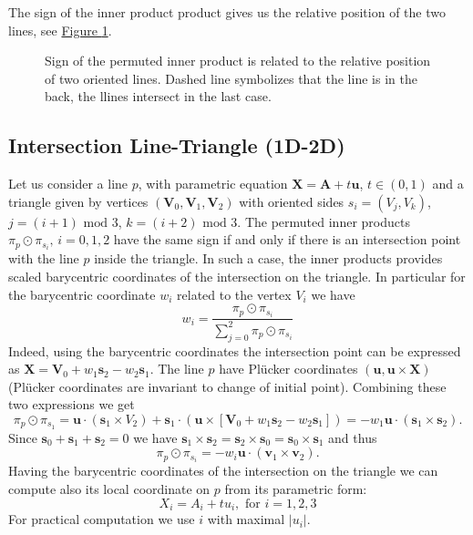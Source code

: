 \documentclass{elsarticle}
\newcommand{\fig}[1]{\hyperref[#1]{Figure \ref{#1}}}
\newcommand{\figpath}{figures/}
\def\vc#1{\mathbf{\boldsymbol{#1}}}     %
\newcommand{\plucker}{Pl\"{u}cker }
\begin{document}
The sign of the inner product product gives us the relative position of the two lines, 
see \fig{fig:plucker_products}.



\begin{figure}[!htb]
  \begin{center}        
    \def\svgwidth{0.7\textwidth}
    
  \end{center}
  \caption{Sign of the permuted inner product is related to the relative position of two oriented lines. Dashed line symbolizes that the line 
           is in the back, the llines intersect in the last case.}
  \label{fig:plucker_products}
\end{figure}



\subsection{Intersection Line-Triangle (1D-2D)}
Let us consider a line $p$, with parametric equation $\vc X = \vc A + t\vc u$, $t\in(0,1)$ and a triangle given by vertices $(\vc V_0, \vc V_1, \vc V_2)$ 
with oriented sides $s_i=(V_j, V_k)$, $j=(i+1)\text{ mod }3$, $k=(i+2)\text{ mod }3$. The permuted inner products $\pi_p \odot \pi_{s_i},\, i=0,1,2$ have the same sign if and only if there
is an intersection point with the       line $p$ inside the triangle. In such a case, the inner products provides scaled barycentric coordinates of the intersection on the triangle.
In particular for the barycentric coordinate $w_i$ related to the vertex $V_i$ we have
\[
   w_i = \frac{\pi_p \odot \pi_{s_i}}{ \sum_{j=0}^{2} \pi_p \odot \pi_{s_i} }
\]
Indeed, using the barycentric coordinates the intersection point can be expressed as $\vc X = \vc V_0 + w_1 \vc s_2 - w_2 \vc s_1$.
The line $p$ have \plucker coordinates $(\vc u, \vc u \times \vc X)$ (\plucker coordinates are invariant to change of initial point). Combining these two expressions we get
\[
   \pi_p \odot \pi_{s_1} = \vc u \cdot (\vc s_1 \times V_2) + \vc s_1 \cdot ( \vc u \times [\vc V_0 + w_1\vc s_2 - w_2 \vc s_1])
   =-w_1 \vc u \cdot (\vc s_1 \times \vc s_2).
\]
Since $\vc s_0 + \vc s_1 + \vc s_2=0$ we have $ \vc s_1 \times \vc s_2 = \vc s_2 \times \vc s_0 = \vc s_0 \times \vc s_1$ and thus
\[
   \pi_p \odot \pi_{s_i} = -w_i \vc u \cdot (\vc v_1 \times \vc v_2).
\]
Having the barycentric coordinates of the intersection on the triangle we can compute also its local coordinate on $p$ from its parametric form:
\[
   X_i  = A_i + t u_i, \text{ for } i=1,2,3
\]
For practical computation we use $i$ with maximal $|u_i|$.
\end{document}
